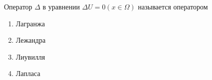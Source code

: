 Оператор \(\Delta\) в уравнении \(\Delta U =0 ( x\in \Omega )\) называется оператором

\begin{enumerate}[label=\arabic*)]
    \item Лагранжа
    \item Лежандра
    \item Лиувилля
    \item Лапласа
\end{enumerate}

